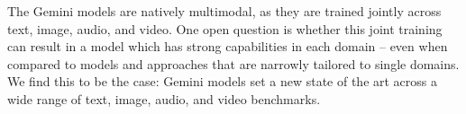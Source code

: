 The Gemini models are natively multimodal, as they are trained jointly across text, image, audio, and video. One open question is whether this joint training can result in a model which has strong capabilities in each domain – even when compared to models and approaches that are narrowly tailored to single domains. We find this to be the case: Gemini models set a new state of the art across a wide range of text, image, audio, and video benchmarks. 
